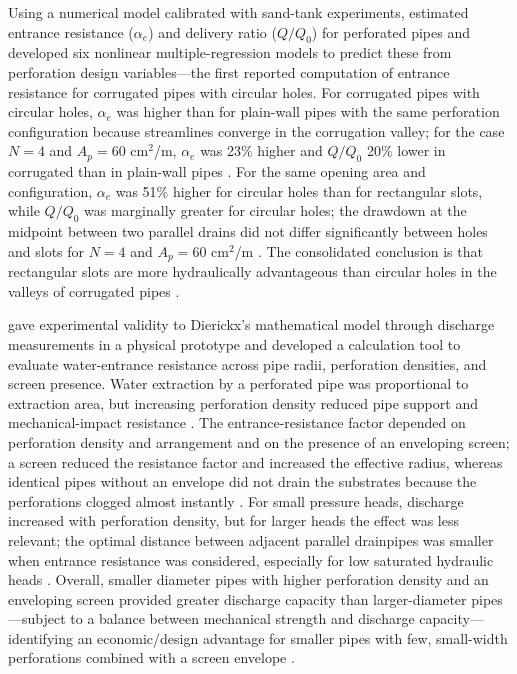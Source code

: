 Using a numerical model calibrated with sand-tank experiments, \textcite{Gaj2020}
estimated entrance resistance ($\alpha_e$) and delivery ratio ($Q/Q_0$) for perforated
pipes and developed six nonlinear multiple-regression models to predict these from
perforation design variables---the first reported computation of entrance resistance for
corrugated pipes with circular holes. For corrugated pipes with circular holes, $\alpha_e$
was higher than for plain-wall pipes with the same perforation configuration because
streamlines converge in the corrugation valley; for the case $N=4$ and
$A_p = 60$ cm$^2$/m, $\alpha_e$ was 23\% higher and $Q/Q_0$ 20\% lower in corrugated than
in plain-wall pipes \parencite{Gaj2020}. For the same opening area and configuration,
$\alpha_e$ was 51\% higher for circular holes than for rectangular slots, while $Q/Q_0$
was marginally greater for circular holes; the drawdown at the midpoint between two
parallel drains did not differ significantly between holes and slots for $N=4$ and
$A_p = 60$ cm$^2$/m \parencite{Gaj2020}. The consolidated conclusion is that rectangular
slots are more hydraulically advantageous than circular holes in the valleys of corrugated
pipes \parencite{Gaj2020}.

\textcite{Oyarce2017} gave experimental validity to Dierickx's mathematical model through
discharge measurements in a physical prototype and developed a calculation tool to
evaluate water-entrance resistance across pipe radii, perforation densities, and screen
presence. Water extraction by a perforated pipe was proportional to extraction area, but
increasing perforation density reduced pipe support and mechanical-impact resistance
\parencite{Oyarce2017}. The entrance-resistance factor depended on perforation density and
arrangement and on the presence of an enveloping screen; a screen reduced the resistance
factor and increased the effective radius, whereas identical pipes without an envelope did
not drain the substrates because the perforations clogged almost instantly
\parencite{Oyarce2017}. For small pressure heads, discharge increased with perforation
density, but for larger heads the effect was less relevant; the optimal distance between
adjacent parallel drainpipes was smaller when entrance resistance was considered,
especially for low saturated hydraulic heads \parencite{Oyarce2017}. Overall, smaller
diameter pipes with higher perforation density and an enveloping screen provided greater
discharge capacity than larger-diameter pipes---subject to a balance between mechanical
strength and discharge capacity---identifying an economic/design advantage for smaller
pipes with few, small-width perforations combined with a screen envelope
\parencite{Oyarce2017}.


